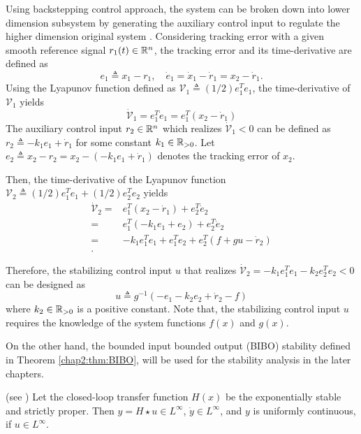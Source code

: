 Using backstepping control approach, the system can be broken down into lower dimension subsystem by generating the auxiliary control input to regulate the higher dimension original system \cite{RN7}.
Considering tracking error with a given smooth reference signal $r_1(t)\in\mathbb{R}^n$, the tracking error and its time-derivative are defined as
\begin{equation}
  e_1\triangleq x_1-r_1,\quad \dot e_1= \dot x_1-\dot r_1=x_2-\dot r_1
  .
\end{equation}
Using the Lyapunov function defined as $\mathcal V_1\triangleq (1/2)e_1^Te_1$, the time-derivative of $\mathcal V_1$ yields
\begin{equation}
  \dot {\mathcal V}_1 =e_1^T\dot e_1=e_1^T(x_2-\dot r_1)
\end{equation}
The auxiliary control input $r_2\in\mathbb{R}^n$ which realizes $\dot{\mathcal V}_1<0$ can be defined as $r_2\triangleq  -k_1e_1+\dot r_1$ for some constant $k_1\in\mathbb{R}_{>0}$.
Let $e_2\triangleq x_2-r_2=x_2-(-k_1e_1+\dot r_1)$ denotes the tracking error of $x_2$.

Then, the time-derivative of the Lyapunov function $\mathcal V_2\triangleq (1/2)e_1^Te_1+(1/2)e_2^Te_2$ yields
\begin{equation}
  \begin{aligned}
    \dot {\mathcal V}_2
    =&
    e_1^T(x_2-\dot r_1)+e_2^T\dot e_2\\
    =&
    e_1^T(-k_1e_1+e_2)+e_2^T\dot e_2\\
    =&
    -k_1e_1^Te_1+e_1^Te_2+e_2^T(f+gu-\dot r_2)\\
    .
  \end{aligned}
\end{equation}

Therefore, the stabilizing control input $u$ that realizes $\dot {\mathcal V}_2=-k_1e_1^Te_1-k_2e_2^Te_2<0$ can be designed as
\begin{equation}
  u\triangleq g^{-1} (-e_1 -k_2e_2 +\dot r_2 -f)
\end{equation}
where $k_2\in\mathbb{R}_{>0}$ is a positive constant.
Note that, the stabilizing control input $u$ requires the knowledge of the system functions $f(x)$ and $g(x)$.

On the other hand, the bounded input bounded output (BIBO) stability defined in Theorem \ref{chap2:thm:BIBO}, will be used for the stability analysis in the later chapters.

\begin{theorem}(see \cite[Theorem 1.9]{RN23})
  Let the closed-loop transfer function $H(x)$ be the exponentially stable and strictly proper.
  Then $y = H\star u\in L^\infty$, $\dot y\in L^\infty$, and $y$ is uniformly continuous, if $u\in L^\infty$.
  \label{chap2:thm:BIBO}
\end{theorem}

